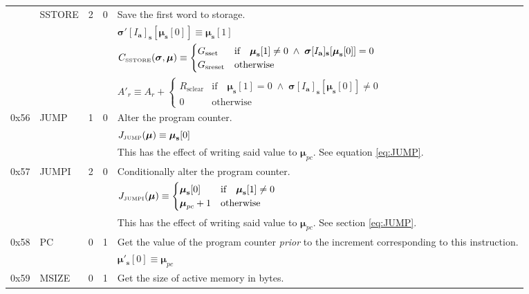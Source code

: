 \documentclass[9pt,oneside]{amsart}
\begin{document}
\begin{tabularx}{\textwidth}{rlrrX}
{\midrule
0x55 & {\small SSTORE} & 2 & 0 & Save the first word to storage. \\
&&&& $\boldsymbol{\sigma}'[I_\mathbf{a}]_\mathbf{s}[ \boldsymbol{\mu}_\mathbf{s}[0] ] \equiv \boldsymbol{\mu}_\mathbf{s}[1] $ \hypertarget{C tiny SSTORE}{\\
&&&& $C_{\text{\tiny SSTORE}}(\boldsymbol{\sigma}, \boldsymbol{\mu}) \equiv \begin{cases}
G_{\mathrm{sset}} & \text{if} \quad \boldsymbol{\mu}_\mathbf{s}[1] \neq 0 \; \wedge \; \boldsymbol{\sigma}[I_\mathbf{a}]_\mathbf{s}[\boldsymbol{\mu}_\mathbf{s}[0]] = 0 \\
G_{\mathrm{sreset}} & \text{otherwise}
\end{cases}$ }\\
&&&& $A'_{r} \equiv A_{r} + \begin{cases}
R_{\mathrm{sclear}} & \text{if} \quad \boldsymbol{\mu}_\mathbf{s}[1] = 0 \; \wedge \; \boldsymbol{\sigma}[I_\mathbf{a}]_\mathbf{s}[\boldsymbol{\mu}_\mathbf{s}[0]] \neq 0 \\
0 & \text{otherwise}
\end{cases}$ }\\
\midrule
0x56 & {\small JUMP} & 1 & 0 & Alter the program counter. \\
&&&& $J_{\text{\tiny JUMP}}(\boldsymbol{\mu}) \equiv \boldsymbol{\mu}_\mathbf{s}[0] $ \\
&&&& This has the effect of writing said value to $\boldsymbol{\mu}_{pc}$. See equation \hyperlink{JUMP}{\ref{eq:JUMP}}. \\
\midrule
0x57 & {\small JUMPI} & 2 & 0 & Conditionally alter the program counter. \\
&&&& $J_{\text{\tiny JUMPI}}(\boldsymbol{\mu}) \equiv \begin{cases} \boldsymbol{\mu}_\mathbf{s}[0] & \text{if} \quad \boldsymbol{\mu}_\mathbf{s}[1] \neq 0 \\ \boldsymbol{\mu}_{pc} + 1 & \text{otherwise} \end{cases} $ \\
&&&& This has the effect of writing said value to $\boldsymbol{\mu}_{pc}$. See section \hyperlink{JUMPI}{\ref{eq:JUMP}}. \\
\midrule
0x58 & {\small PC} & 0 & 1 & Get the value of the program counter \textit{prior} to the increment corresponding to this instruction. \\
&&&& $\boldsymbol{\mu}'_\mathbf{s}[0] \equiv \boldsymbol{\mu}_{pc}$ \\
\midrule
0x59 & {\small MSIZE} & 0 & 1 & Get the size of active memory in bytes. \\

\end{tabularx}
\end{document}
